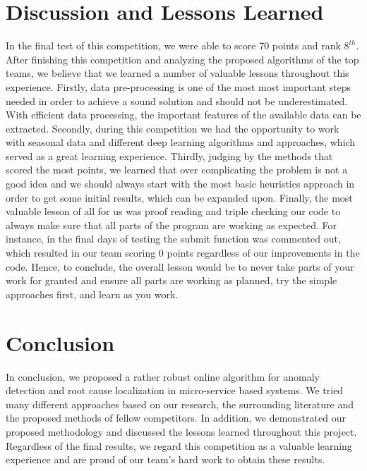 \documentclass[12pt]{article}
\begin{document}
\section{Discussion and Lessons Learned}
In the final test of this competition, we were able to score 70 points and rank $8^{th}$. After finishing this competition and analyzing the proposed algorithms of the top teams, we believe that we learned a number of valuable lessons throughout this experience. Firstly, data pre-processing is one of the most most important steps needed in order to achieve a sound solution and should not be underestimated. With efficient data processing, the important features of the available data can be extracted. Secondly, during this competition we had the opportunity to work with seasonal data and different deep learning algorithms and approaches, which served as a great learning experience. Thirdly, judging by the methods that scored the most points, we learned that over complicating the problem is not a good idea and we should always start with the most basic heuristics approach in order to get some initial results, which can be expanded upon. Finally, the most valuable lesson of all for us was proof reading and triple checking our code to always make sure that all parts of the program are working as expected. For instance, in the final days of testing the submit function was commented out, which resulted in our team scoring 0 points regardless of our improvements in the code. Hence, to conclude, the overall lesson would be to never take parts of your work for granted and ensure all parts are working as planned, try the simple approaches first, and learn as you work. 
\section{Conclusion}
In conclusion, we proposed a rather robust online algorithm for anomaly detection and root cause localization in micro-service based systems. We tried many different approaches based on our research, the surrounding literature and the proposed methods of fellow competitors. In addition, we demonstrated our proposed methodology and discussed the lessons learned throughout this project. Regardless of the final results, we regard this competition as a valuable learning experience and are proud of our team's hard work to obtain these results. 
\end{document}
